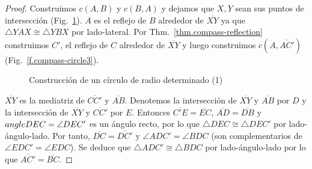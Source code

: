 \begin{proof}
Construimos $c(A,B)$ y $c(B,A)$ y dejamos que $X,Y$ sean sus puntos de intersección (Fig.~\ref{f.compass-circle1}). $A$ es el reflejo de $B$ alrededor de $\overline{XY}$ ya que $\triangle YAX\cong \triangle YBX$ por lado-lateral. Por Thm.~\ref{thm.compass-reflection} construimos $C'$, el reflejo de $C$ alrededor de $\overline{XY}$ y luego construimos $c(A,\overline{AC'})$ (Fig.~\ref{f.compass-circle3}).

\begin{figure}[b]
\begin{center}
\end{center}
\caption{Construcción de un círculo de radio determinado (1)}\label{f.compass-circle1}
\end{figure}

$\overline{XY}$ es la mediatriz de $\overline{CC'}$ y $\overline{AB}$. Denotemos la intersección de $\overline{XY}$ y $\overline{AB}$ por $D$ y la intersección de $\overline{XY}$ y $\overline{CC'}$ por $E$. Entonces $\overline{C'E}=\overline{EC}$, $\overline{AD}=\overline{DB}$ y $\\angle DEC=\angle DEC'$ es un ángulo recto, por lo que $\triangle DEC\cong\triangle DEC'$ por lado-ángulo-lado. Por tanto, $\overline{DC}=\overline{DC'}$ y $\angle ADC'=\angle BDC$ (son complementarios de $\angle EDC'=\angle EDC$). Se deduce que $\triangle ADC'\cong\triangle BDC$ por lado-ángulo-lado por lo que $\overline{AC'}=\overline{BC}$.
\end{proof}


